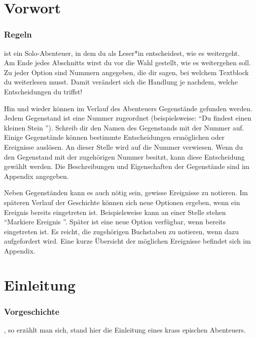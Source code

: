 
\chapter*{Vorwort}

\subsection{Regeln}

 ist ein Solo-Abenteuer, in dem du als Leser*in entscheidest, wie es weitergeht.
Am Ende jedes Abschnitts wirst du vor die Wahl gestellt, wie es weitergehen soll.
Zu jeder Option sind Nummern angegeben, die dir sagen, bei welchem Textblock du weiterlesen musst.
Damit verändert sich die Handlung je nachdem, welche Entscheidungen du triffst!

Hin und wieder können im Verlauf des Abenteuers Gegenstände gefunden werden. 
Jedem Gegenstand ist eine Nummer zugeordnet (beispielsweise: ``Du findest einen kleinen Stein ''). 
Schreib dir den Namen des Gegenstands mit der Nummer auf. 
Einige Gegenstände können bestimmte Entscheidungen ermöglichen oder Ereignisse auslösen. 
An dieser Stelle wird auf die Nummer verwiesen. 
Wenn du den Gegenstand mit der zugehörigen Nummer besitzt, kann diese Entscheidung gewählt werden. 
Die Beschreibungen und Eigenschaften der Gegenstände sind im Appendix angegeben. 

Neben Gegenständen kann es auch nötig sein, gewisse Ereignisse zu notieren. 
Im späteren Verlauf der Geschichte können sich neue Optionen ergeben, wenn ein Ereignis bereits eingetreten ist.
Beispielsweise kann an einer Stelle stehen ``Markiere Ereignis ''.
Später ist eine neue Option verfügbar, wenn  bereits eingetreten ist. 
Es reicht, die zugehörigen Buchstaben zu notieren, wenn dazu aufgefordert wird. 
Eine kurze Übersicht der möglichen Ereignisse befindet sich im Appendix.

\chapter*{Einleitung}

\subsection{Vorgeschichte}

, so erzählt man sich, stand hier die Einleitung eines krass epischen Abenteuers.

